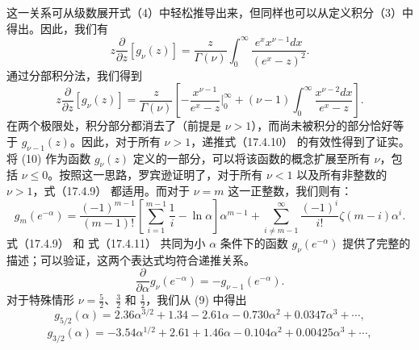 这一关系可从级数展开式（4）中轻松推导出来，但同样也可以从定义积分（3）中得出。因此，我们有
\begin{equation}\tag{17.4.14}\label{eq:17.4.14}
z \frac { \partial } { \partial z } [ g _ { \nu } ( z ) ] = \frac { z } { \Gamma ( \nu ) } \int _ { 0 } ^{\infty} \frac { e ^{x} x ^{\nu - 1} d x } { ( e ^{x} - z ) ^{2} } .
\end{equation}
通过分部积分法，我们得到
\begin{equation}\tag{17.4.15}\label{eq:17.4.15}
z \frac { \partial } { \partial z } \left[ g _ { \nu } ( z ) \right] = \frac { z } { \Gamma ( \nu ) } \left[ - \frac { x ^{\nu - 1} } { e ^{x} - z } \Big | _ { 0 } ^{\infty} + ( \nu - 1 ) \int _ { 0 } ^{\infty} \frac { x ^{\nu - 2} d x } { e ^{x} - z } \right] .
\end{equation}
在两个极限处，积分部分都消去了（前提是 \(\nu > 1\)），而尚未被积分的部分恰好等于 \(g_{\nu-1}(z)\)。因此，对于所有 \(\nu > 1\)，递推式（17.4.10） 的有效性得到了证实。
将 (10) 作为函数 \(g_{\nu}(z)\) 定义的一部分，可以将该函数的概念扩展至所有 \(\nu\)，包括 \(\nu \leq 0\)。按照这一思路，罗宾逊证明了，对于所有 \(\nu < 1\) 以及所有非整数的 \(\nu > 1\)，式（17.4.9） 都适用。而对于 \(\nu = m\) 这一正整数，我们则有：
\begin{equation}\tag{17.4.16}\label{eq:17.4.16}
g _ { m } ( e ^{- \alpha} ) = \frac { ( - 1 ) ^{m - 1} } { ( m - 1 ) ! } \left[ \sum _ { i = 1 } ^{m - 1} \frac { 1 } { i } - \ln \alpha \right] \alpha ^{m - 1} + \sum _ { i \neq m - 1 } ^{\infty} \frac { ( - 1 ) ^{i} } { i ! } \zeta ( m - i ) \alpha ^{i} .
\end{equation}
式（17.4.9） 和 式（17.4.11） 共同为小 \(\alpha\) 条件下的函数 \(g_{\nu}(e^{-\alpha})\) 提供了完整的描述；可以验证，这两个表达式均符合递推关系。
\begin{equation}\tag{17.4.17}\label{eq:17.4.17}
\frac { \partial } { \partial \alpha } g _ { \nu } ( e ^{- \alpha} ) = - g _ { \nu - 1 } ( e ^{- \alpha} ) .
\end{equation}
对于特殊情形 \(\nu = \frac{5}{2}\)、\(\frac{3}{2}\) 和 \(\frac{1}{2}\)，我们从 (9) 中得出
\begin{equation}\tag{17.4.18}\label{eq:17.4.18}
g _ { 5 / 2 } ( \alpha ) = 2 . 36 \alpha ^{3 / 2} + 1 . 34 - 2 . 61 \alpha - 0 . 73 0 \alpha ^{2} + 0 . 03 47 \alpha ^{3} + \cdots ,
\end{equation}
\begin{equation}\tag{17.4.19}\label{eq:17.4.19}
g _ { 3 / 2 } ( \alpha ) = - 3 . 54 \alpha ^{1 / 2} + 2 . 61 + 1 . 46 \alpha - 0 . 10 4 \alpha ^{2} + 0 . 00 42 5 \alpha ^{3} + \cdots ,
\end{equation}
